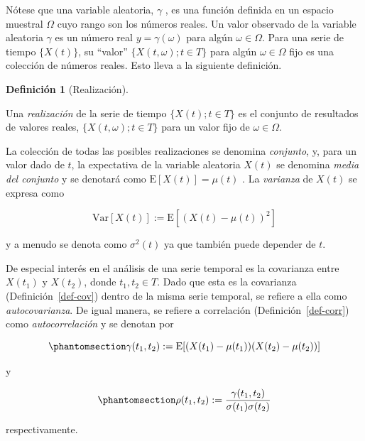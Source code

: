 \documentclass[
  us-letterpaper,
]{scrreprt}
\theoremstyle{plain}
\theoremstyle{definition}
\theoremstyle{plain}
\theoremstyle{definition}
\newtheorem{definition}{Definición}[chapter]
\theoremstyle{remark}
\begin{document}
Nótese que una variable aleatoria, \(\gamma\) , es una función definida
en un espacio muestral \(\Omega\) cuyo rango son los números reales. Un
valor observado de la variable aleatoria \(\gamma\) es un número real
\(y=\gamma(\omega)\) para algún \(\omega\in\Omega\). Para una serie de
tiempo \(\{X(t)\}\), su ``valor'' \(\{X(t,\omega);t\in T\}\) para algún
\(\omega\in\Omega\) fijo es una colección de números reales. Esto lleva
a la siguiente definición.

\begin{definition}[Realización]\protect\hypertarget{def-realizacion}{}\label{def-realizacion}

Una \emph{realización} de la serie de tiempo \(\{X(t);t\in T\}\) es el
conjunto de resultados de valores reales, \(\{X(t,\omega);t\in T\}\)
para un valor fijo de \(\omega \in \Omega\).

\end{definition}

La colección de todas las posibles realizaciones se denomina
\emph{conjunto}, y, para un valor dado de \(t\), la expectativa de la
variable aleatoria \(X(t)\) se denomina \emph{media del conjunto} y se
denotará como \(\mathrm E[X(t)]=\mu(t)\) . La \emph{varianza} de
\(X(t)\) se expresa como

\[
\mathrm{Var}[X(t)]:=\mathrm{E}[(X(t)-\mu(t))^2]
\]

y a menudo se denota como \(\sigma^2(t)\) ya que también puede depender
de \(t\).

\label{.remark}
De especial interés en el análisis de una serie temporal es la
covarianza entre \(X(t_1)\) y \(X(t_2)\), donde \(t_1, t_2\in T\). Dado
que esta es la covarianza (Definición~\ref{def-cov}) dentro de la misma
serie temporal, se refiere a ella como \emph{autocovarianza}. De igual
manera, se refiere a correlación (Definición~\ref{def-corr}) como
\emph{autocorrelación} y se denotan por

\begin{equation}\phantomsection\label{eq-autocov}{
\gamma(t_1,t_2):=\mathrm{E}[(X(t_1)-\mu(t_1))(X(t_2)-\mu(t_2))]
}\end{equation}

y

\begin{equation}\phantomsection\label{eq-autocorr}{
\rho(t_1,t_2):= \frac{\gamma(t_1,t_2)}{\sigma(t_1)\sigma(t_2)} 
}\end{equation}

respectivamente.
\end{document}
